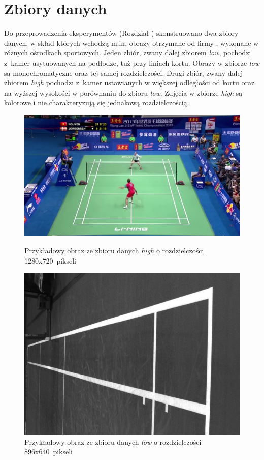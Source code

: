 \section{Zbiory danych}
\label{sec:zbiory}
Do przeprowadzenia eksperymentów (Rozdział ) skonstruowano dwa zbiory danych, w skład których wchodzą m.in. obrazy otrzymane od firmy \blue{}, wykonane w różnych ośrodkach sportowych.
Jeden zbiór, zwany dalej zbiorem \textit{low}, pochodzi z~kamer usytuowanych na podłodze, tuż przy liniach kortu. Obrazy w zbiorze \textit{low} są monochromatyczne oraz tej samej rozdzielczości.
Drugi zbiór, zwany dalej zbiorem \textit{high} pochodzi z~kamer ustawianych w większej odległości od kortu oraz na wyższej wysokości w porównaniu do zbioru \textit{low}. Zdjęcia w zbiorze \textit{high} są kolorowe i nie charakteryzują się jednakową rozdzielczością.


\begin{figure}[!htb]
    \includegraphics[width=\linewidth]{../../badminton/datasets/high/split/test_court2-00002.png}
    \caption{Przykładowy obraz ze zbioru danych \textit{high} o rozdzielczości 1280x720~pikseli}
  \endminipage\hfill
    \includegraphics[width=\linewidth]{../../badminton/datasets/low/split/1564909032792410075.jpg}
    \caption{Przykładowy obraz ze zbioru danych \textit{low} o rozdzielczości 896x640~pikseli}
  \endminipage\hfill
\end{figure}

